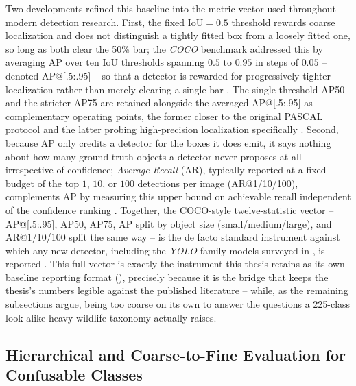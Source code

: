 Two developments refined this baseline into the metric vector used throughout modern detection research. First, the fixed IoU$=0.5$ threshold rewards coarse localization and does not distinguish a tightly fitted box from a loosely fitted one, so long as both clear the 50\% bar; the \textit{COCO} benchmark \cite{linMicrosoftCOCOCommon2015} addressed this by averaging AP over ten IoU thresholds spanning $0.5$ to $0.95$ in steps of $0.05$ -- denoted AP@[.5:.95] -- so that a detector is rewarded for progressively tighter localization rather than merely clearing a single bar \cite{zouObjectDetection202023}. The single-threshold AP50 and the stricter AP75 are retained alongside the averaged AP@[.5:.95] as complementary operating points, the former closer to the original PASCAL protocol and the latter probing high-precision localization specifically \cite{zouObjectDetection202023}. Second, because AP only credits a detector for the boxes it does emit, it says nothing about how many ground-truth objects a detector never proposes at all irrespective of confidence; \textit{Average Recall} (AR), typically reported at a fixed budget of the top $1$, $10$, or $100$ detections per image (AR@1/10/100), complements AP by measuring this upper bound on achievable recall independent of the confidence ranking \cite{zouObjectDetection202023}. Together, the COCO-style twelve-statistic vector -- AP@[.5:.95], AP50, AP75, AP split by object size (small/medium/large), and AR@1/10/100 split the same way -- is the de facto standard instrument against which any new detector, including the \textit{YOLO}-family models surveyed in , is reported \cite{zouObjectDetection202023}. This full vector is exactly the instrument this thesis retains as its own baseline reporting format (), precisely because it is the bridge that keeps the thesis's numbers legible against the published literature -- while, as the remaining subsections argue, being too coarse on its own to answer the questions a 225-class look-alike-heavy wildlife taxonomy actually raises.

\subsection{Hierarchical and Coarse-to-Fine Evaluation for Confusable Classes}\label{sec:lit_hierarchical_evaluation}

